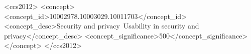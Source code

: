\documentclass[sigconf, anonymous]{acmart}
\theoremstyle{plain}
\theoremstyle{definition}
\begin{document}
\begin{CCSXML}
<ccs2012>
<concept>
<concept_id>10002978.10003029.10011703</concept_id>
<concept_desc>Security and privacy~Usability in security and privacy</concept_desc>
<concept_significance>500</concept_significance>
</concept>
</ccs2012>
\end{CCSXML}



\maketitle





\end{document}
